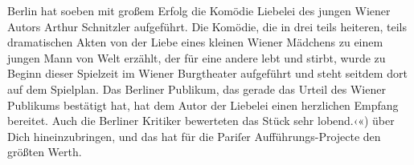 {{{                        Berlin hat soeben mit großem Erfolg die
                     Komödie Liebelei des jungen Wiener Autors Arthur Schnitzler aufgeführt. Die Komödie, die in drei teils heiteren,
                     teils dramatischen Akten von der Liebe eines kleinen Wiener Mädchens zu einem jungen Mann von Welt erzählt, der
                     für eine andere lebt und stirbt, wurde zu Beginn dieser Spielzeit im Wiener Burgtheater aufgeführt und steht seitdem dort auf dem Spielplan. Das
                        Berliner Publikum, das gerade das Urteil
                     des Wiener Publikums bestätigt hat, hat dem
                        Autor der Liebelei einen herzlichen Empfang bereitet.
                     Auch die Berliner Kritiker bewerteten das
                        Stück sehr
                     lobend.‹«)}}}\label{K_L02767-3} über Dich hineinzubringen, und das hat für die Pariſer Aufführungs-Projecte den größten Werth.
